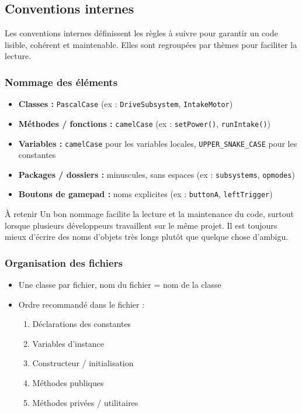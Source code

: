 \documentclass[12pt, a4paper]{report}
\begin{document}
    \subsection{Conventions internes}

    Les conventions internes définissent les règles à suivre pour garantir un code lisible, cohérent et maintenable. Elles sont regroupées par thèmes pour faciliter la lecture.

    \subsubsection*{Nommage des éléments}
    \begin{itemize}
        \item \textbf{Classes :} \texttt{PascalCase} (ex : \texttt{DriveSubsystem}, \texttt{IntakeMotor})
        \item \textbf{Méthodes / fonctions :} \texttt{camelCase} (ex : \texttt{setPower()}, \texttt{runIntake()})
        \item \textbf{Variables :} \texttt{camelCase} pour les variables locales, \texttt{UPPER\_SNAKE\_CASE} pour les constantes
        \item \textbf{Packages / dossiers :} minuscules, sans espaces (ex : \texttt{subsystems}, \texttt{opmodes})
        \item \textbf{Boutons de gamepad :} noms explicites (ex : \texttt{buttonA}, \texttt{leftTrigger})
    \end{itemize}

    \begin{mydefinition}{À retenir}
        Un bon nommage facilite la lecture et la maintenance du code, surtout lorsque plusieurs développeurs travaillent sur le même projet. Il est toujours mieux d'écrire des noms d'objets très longs plutôt que quelque chose d'ambigu.
    \end{mydefinition}


    \subsubsection*{Organisation des fichiers}
    \begin{itemize}
        \item Une classe par fichier, nom du fichier = nom de la classe
        \item Ordre recommandé dans le fichier :
        \begin{enumerate}
            \item Déclarations des constantes
            \item Variables d’instance
            \item Constructeur / initialisation
            \item Méthodes publiques
            \item Méthodes privées / utilitaires
        \end{enumerate}
    \end{itemize}
\end{document}
